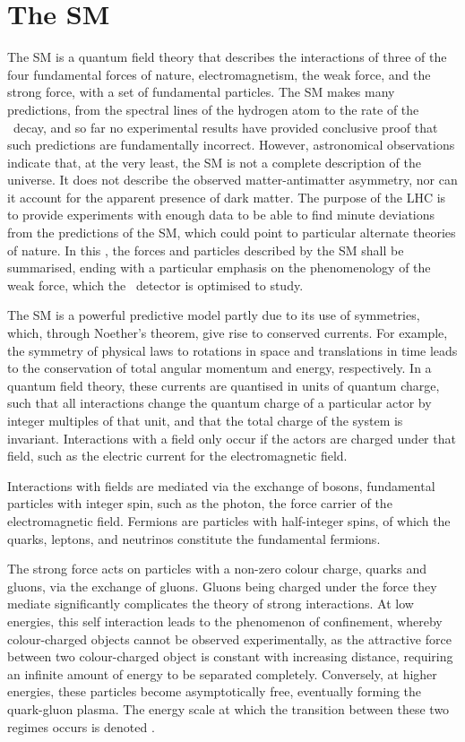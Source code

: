 \chapter{The \acl{SM}}
\label{chap:intro:sm}

The \acf{SM} is a quantum field theory that describes the interactions of three 
of the four fundamental forces of nature, electromagnetism, the weak force, and 
the strong force, with a set of fundamental particles.
The \ac{SM} makes many predictions, from the spectral lines of the hydrogen  
atom to the rate of the \BsTomumu\ decay, and so far no experimental results 
have provided conclusive proof that such predictions are fundamentally 
incorrect.
However, astronomical observations indicate that, at the very least, the 
\ac{SM} is not a complete description of the universe.
It does not describe the observed matter-antimatter asymmetry, nor can it 
account for the apparent presence of dark matter.
The purpose of the \ac{LHC} is to provide experiments with enough data to be 
able to find minute deviations from the predictions of the \ac{SM}, which could point to particular alternate theories of nature.
In this , the forces and particles described by the 
\ac{SM} shall be summarised, ending with a particular emphasis on the 
phenomenology of the weak force, which the \lhcb\ detector is optimised to 
study.

The \ac{SM} is a powerful predictive model partly due to its use of symmetries, which, through Noether's theorem, give rise to conserved currents.
For example, the symmetry of physical laws to rotations in space and 
translations in time leads to the conservation of total angular momentum and energy, 
respectively.
In a quantum field theory, these currents are quantised in units of quantum charge, 
such that all 
interactions change the quantum charge of a particular actor by integer multiples of 
that unit, and that the total charge of the system is invariant.
Interactions with a field only occur if the actors are charged under that 
field, such as the electric current for the electromagnetic field.

Interactions with fields are mediated via the exchange of bosons, fundamental 
particles with integer spin, such as the photon, the force carrier of the 
electromagnetic field.
Fermions are particles with half-integer spins, of which the quarks, leptons, 
and neutrinos constitute the fundamental fermions.

The strong force acts on particles with a non-zero colour charge, quarks and gluons, via the 
exchange of gluons.
Gluons being charged under the force they mediate significantly complicates the 
theory of strong interactions.
At low energies, this self interaction leads to the phenomenon of confinement, 
whereby colour-charged objects cannot be observed experimentally, as the 
attractive force between two colour-charged object is constant with increasing 
distance, requiring an infinite amount of energy to be separated completely.
Conversely, at higher energies, these particles become asymptotically free, 
eventually forming the quark-gluon plasma.
The energy scale at which the transition between these two regimes occurs is 
denoted \qcdscale.

